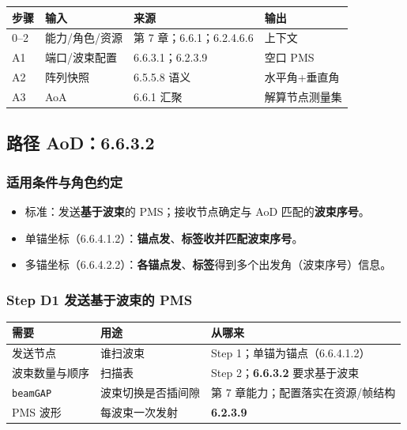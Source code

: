 \documentclass[11pt,a4paper]{ctexart}
\begin{document}
\begin{table}[h]
\centering
\small
\begin{tabular}{llll}
\toprule
\textbf{步骤} & \textbf{输入} & \textbf{来源} & \textbf{输出} \\
\midrule
0--2 & 能力/角色/资源 & 第 7 章；6.6.1；6.2.4.6.6 & 上下文 \\
A1 & 端口/波束配置 & 6.6.3.1；6.2.3.9 & 空口 PMS \\
A2 & 阵列快照 & 6.5.5.8 语义 & 水平角+垂直角 \\
A3 & AoA & 6.6.1 汇聚 & 解算节点测量集 \\
\bottomrule
\end{tabular}
\end{table}

\subsection{路径 AoD：6.6.3.2}
\label{sec:aod}

\subsubsection{适用条件与角色约定}

\begin{itemize}[nosep]
  \item 标准：发送\textbf{基于波束}的 PMS；接收节点确定与 AoD 匹配的\textbf{波束序号}。
  \item 单锚坐标（6.6.4.1.2）：\textbf{锚点发}、\textbf{标签收并匹配波束序号}。
  \item 多锚坐标（6.6.4.2.2）：\textbf{各锚点发}、\textbf{标签}得到多个出发角（波束序号）信息。
\end{itemize}

\subsubsection{Step D1 发送基于波束的 PMS}

\begin{table}[h]
\centering
\small
\begin{tabular}{L{3.2cm}L{5.0cm}L{4.8cm}}
\toprule
\textbf{需要} & \textbf{用途} & \textbf{从哪来} \\
\midrule
发送节点 & 谁扫波束 & Step 1；单锚为锚点（6.6.4.1.2） \\
波束数量与顺序 & 扫描表 & Step 2；\textbf{6.6.3.2} 要求基于波束 \\
\texttt{beamGAP} & 波束切换是否插间隙 & 第 7 章能力；配置落实在资源/帧结构 \\
PMS 波形 & 每波束一次发射 & \textbf{6.2.3.9} \\
\bottomrule
\end{tabular}
\end{table}
\end{document}
